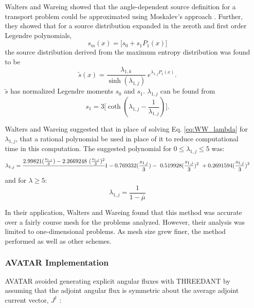 Walters and Wareing \cite{walters_nonlinear_1994, walters_accurate_1996} showed
that the angle-dependent source definition for a transport problem
could be approximated using Moskalev's approach \cite{moskalev_reconstruction_1993}.
Further, they showed that for a source distribution expanded in the zeroth and first
order Legendre polynomials,
\begin{equation}
  s_m(x) = \big[ s_0 + s_1 P_1(x)\big]
\end{equation}
the source distribution derived from the maximum entropy distribution was found
to be
\begin{equation}
  \tilde{s}(x) = \frac{\lambda_{1,k}}{\sinh (\lambda_{1,j})} \
  e^{\lambda_{1,j}P_1(x)} .
\end{equation}
$\tilde{s}$ has normalized Legendre moments $s_0$ and $s_1$. $\lambda_{1,j}$ can
be found from
\begin{equation}
  s_1 = 3\bigg[ \coth(\lambda_{1,j} - \frac{1}{\lambda_{1,j}})\bigg] .
  \label{eq:WW_lambda}
\end{equation}

Walters and Wareing \cite{walters_accurate_1996} suggested that in place of
solving Eq. \eqref{eq:WW_lambda} for $\lambda_{1,j}$, that a rational polynomial
be used in place of it to reduce computational time in this computation. The
suggested polynomial for $0 \leq \lambda_{1,j} \leq 5$ was:
\begin{equation}
  \lambda_{1,j} = \cfrac{2.99821 (\frac{s_{1,j}}{3}) - 2.2669248 \
                  (\frac{s_{1,j}}{3})^2}                        \
                       {1-0.769332 (\frac{s_{1,j}}{3}) -        \
                       0.519928(\frac{s_{1,j}}{3})^2            \
                       + 0.2691594 (\frac{s_{1,j}}{3})^3}
\end{equation}
and for $\lambda \geq 5$:
\begin{equation}
  \lambda_{1,j} = \frac{1}{1-\bar\mu}
\end{equation}

In their application, Walters and Wareing found that this method was accurate
over a fairly course mesh for the problems analyzed. However, their analysis was
limited to one-dimensional problems. As mesh size grew finer, the method
performed as well as other schemes.
\subsubsection{AVATAR Implementation}

AVATAR avoided generating explicit angular fluxes with
THREEDANT by assuming
that the adjoint angular flux is symmetric about the average adjoint current vector,
$J^{\dagger}$ :


